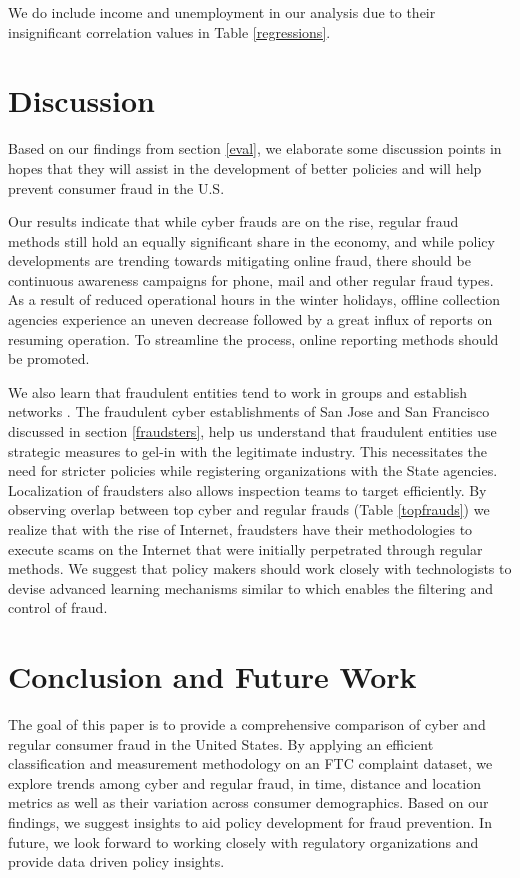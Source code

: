 \documentclass[conference]{IEEEtran}
\begin{document}
We do include income and unemployment in our analysis due to their insignificant correlation values in Table \ref{regressions}.

\section{Discussion}\label{discussion}
Based on our findings from section \ref{eval}, we elaborate some discussion points in hopes that they will assist in the development of better policies and will help prevent consumer fraud in the U.S. 

Our results indicate that while cyber frauds are on the rise, regular fraud methods still hold an equally significant share in the economy, and while policy developments are trending towards mitigating online fraud, there should be continuous awareness campaigns for phone, mail and other regular fraud types. As a result of reduced operational hours in the winter holidays, offline collection agencies experience an uneven decrease followed by a great influx of reports on resuming operation. To streamline the process, online reporting methods should be promoted.

We also learn that fraudulent entities tend to work in groups and establish networks \cite{buffalodebt2}. The fraudulent cyber establishments of San Jose and San Francisco discussed in section \ref{fraudsters}, help us understand that fraudulent entities use strategic measures to gel-in with the legitimate industry. This necessitates the need for stricter policies while registering organizations with the State agencies. Localization of fraudsters also allows inspection teams to target efficiently. 
By observing overlap between top cyber and regular frauds (Table \ref{topfrauds}) we realize that with the rise of Internet, fraudsters have their methodologies to execute scams on the Internet that were initially perpetrated through regular methods. We suggest that policy makers should work closely with technologists to devise advanced learning mechanisms similar to \cite{brause1999neural, moreau1997detection} which enables the filtering and control of fraud.

\section{Conclusion and Future Work}\label{conclusion}

The goal of this paper is to provide a comprehensive comparison of cyber and regular consumer fraud in the United States. By applying an efficient classification and measurement methodology on an FTC complaint dataset, we explore trends among cyber and regular fraud, in time, distance and location metrics as well as their variation across consumer demographics. Based on our findings, we suggest insights to aid policy development for fraud prevention. In future, we look forward to working closely with regulatory organizations and provide data driven policy insights.



 




\end{document}
